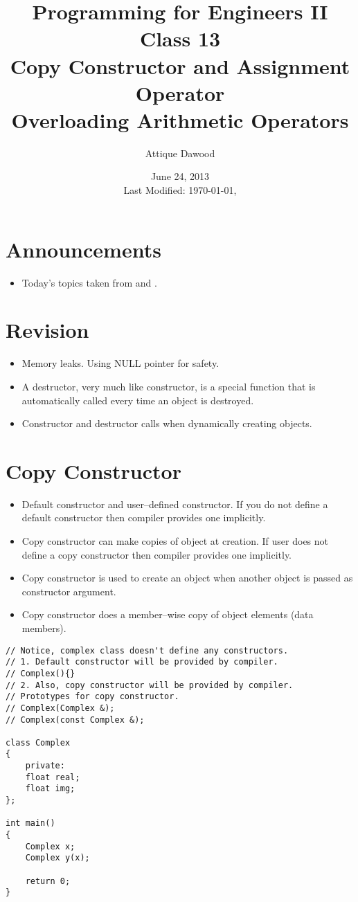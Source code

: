 \documentclass[12pt,a4paper]{article}
\title{\vspace{-2cm}Programming for Engineers II\\Class 13\\Copy Constructor and Assignment Operator\\Overloading Arithmetic Operators}
\author{Attique Dawood}
\date{June 24, 2013\\[0.2cm] Last Modified: \today, \currenttime}
\begin{document}
\maketitle
\section{Announcements}
\begin{itemize}
\item Today's topics taken from \cite{Ref:CPP-Copy-Constructor-and-Assignment-Operator} and \cite{Ref:CPP-Operator-Overloading}.
\end{itemize}
\section{Revision}
\begin{itemize}
\item Memory leaks. Using NULL pointer for safety.
\item A destructor, very much like constructor, is a special function that is automatically called every time an object is destroyed.
\item Constructor and destructor calls when dynamically creating objects.
\end{itemize}
\section{Copy Constructor}
\begin{itemize}
\item Default constructor and user--defined constructor. If you do not define a default constructor then compiler provides one implicitly.
\item Copy constructor can make copies of object at creation. If user does not define a copy constructor then compiler provides one implicitly.
\item Copy constructor is used to create an object when another object is passed as constructor argument.
\item Copy constructor does a member--wise copy of object elements (data members).
\end{itemize}
\begin{lstlisting}[caption={Copy Constructor}]
// Notice, complex class doesn't define any constructors.
// 1. Default constructor will be provided by compiler.
// Complex(){}
// 2. Also, copy constructor will be provided by compiler.
// Prototypes for copy constructor.
// Complex(Complex &);
// Complex(const Complex &);

class Complex
{
	private:
	float real;
	float img;
};

int main()
{
	Complex x;
	Complex y(x);
	
	return 0;
}
\end{lstlisting}
\end{document}
